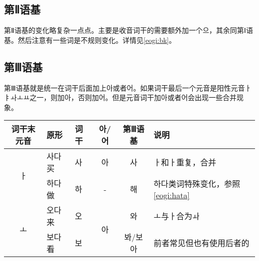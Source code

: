 \subsection{第Ⅱ语基}
第Ⅱ语基的变化略复杂一点点。主要是收音词干的需要额外加一个으，其余同第Ⅰ语基。然后注意有一些词是不规则变化。详情见\ref{eogi:bk}。
\subsection{第Ⅲ语基}
第Ⅲ语基就是统一在词干后面加上아或者어。如果词干最后一个元音是阳性元音ㅏㅑㅘㅗㅛ之一，则加아，否则加어。但是元音词干加아或者어会出现一些合并现象。\\
\begin{tabular}{|c|l|l|c|c|l|}
    \hline
    词干末元音&原形&词干&아/어&第Ⅲ语基&说明\\\hline
    \multirow{2}{*}{ㅏ}&사다 买&사&아&사&ㅏ和ㅏ重复，合并\\\cline{2-6}
    &하다 做&하&-&해&하다类词特殊变化，参照\ref{eogi:hata}\\\hline
    \multirow{2}{*}{ㅗ}&오다 来&오&\multirow{2}{*}{아}&와&ㅗ与ㅏ合为ㅘ\\\cline{2-3}\cline{5-6}
    &보다 看&보&&봐/보아&前者常见但也有使用后者的\\\hline
\end{tabular}\\
